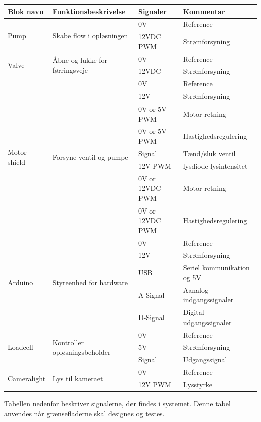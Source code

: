 \begin{center}
		\begin{longtable}{ | m{2cm} | m{4.9cm}| m{3.45cm}| m{4.15cm}| } 
			\hline
			\textbf{Blok navn} &\textbf{Funktionsbeskrivelse} &\textbf{Signaler} &\textbf{Kommentar}\\ 
			\hline
			\multirow{2}{*}{Pump} & \multirow{2}{*}{Skabe flow i opløsningen} & 0V & Reference \\ 
& & 12VDC PWM & Strømforsyning \\	
			\hline	
			\multirow{2}{*}{Valve} & \multirow{2}{*}{Åbne og lukke for førringsveje} & 0V & Reference \\ 
& & 12VDC & Strømforsyning \\	
			\hline	
		\multirow{8}{*}{Motor shield} & \multirow{8}{*}{Forsyne ventil og pumpe} & 0V & Reference \\ 
& & 12V & Strømforsyning \\	
& & 0V or 5V PWM & Motor retning \\	
& & 0V or 5V PWM & Hastighedsregulering \\
& & Signal & Tænd/sluk ventil \\
& & 12V PWM & lysdiode lysintensitet \\
& & 0V or 12VDC PWM & Motor retning \\	
& & 0V or 12VDC PWM & Hastighedsregulering \\
			\hline	
			\multirow{5}{*}{Arduino} & \multirow{5}{*}{Styreenhed for hardware} & 0V & Reference \\ 
& & 12V & Strømforsyning \\	
& & USB & Seriel kommunikation og 5V \\
& & A-Signal & Aanalog indgangssignaler \\
& & D-Signal & Digital udgangssignaler \\
			\hline
			\multirow{3}{*}{Loadcell} & \multirow{3}{*}{Kontroller opløsningsbeholder} & 0V & Reference \\ 
& & 5V & Strømforsyning \\	
& & Signal & Udgangssignal \\	
			\hline
			\multirow{2}{*}{Cameralight} & \multirow{2}{*}{Lys til kameraet} & 0V & Reference \\ 
& & 12V PWM & Lysstyrke \\	
			\hline
		\end{longtable}
	\end{center}

	
\newpage
Tabellen nedenfor beskriver signalerne, der findes i systemet. Denne tabel anvendes når grænsefladerne skal designes og testes.

